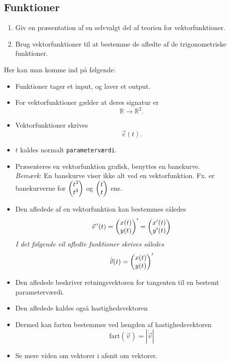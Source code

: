 \documentclass{article}
\begin{document}
\begin{tcolorbox}
	\section{Funktioner}
	\tcblower
	\begin{enumerate}
		\item Giv en præsentation af en selvvalgt del af teorien for vektorfunktioner.
		\item Brug vektorfunktioner til at bestemme de afledte af de trigonometriske funktioner.
	\end{enumerate}
\end{tcolorbox}
Her kan man komme ind på følgende:
\begin{itemize}
	\item Funktioner tager et input, og laver et output.
	\item For vektorfunktioner gælder at deres signatur er
		\[
			\mathbb{R} \rightarrow \mathbb{R}^2.
		\] 
	\item Vektorfunktioner skrives
		\[
			\vec{v}(t).
		\] 
	\item $t$ kaldes normalt \texttt{parameterværdi}.
	\item Præsenteres en vektorfunktion grafisk, benyttes en banekurve.\\
		\textit{Bemærk}: En banekurve viser ikke alt ved en vektorfunktion. Fx.
		er banekurverne for $ \begin{pmatrix} t^3\\ t^3 \end{pmatrix} $ og $ \begin{pmatrix} t\\ t \end{pmatrix} $ ens.
	\item Den afledede af en vektorfunktion kan bestemmes således
		\[
			\vec{v}\,'(t) =  \begin{pmatrix} x(t)\\ y(t) \end{pmatrix} ' =  \begin{pmatrix} x'(t)\\ y'(t) \end{pmatrix} 
		\] 
		\textit{I det følgende vil afledte funktioner skrives således}
		\[
			\dot{\vec{v}}(t) = { \begin{pmatrix} x(t)\\ y(t) \end{pmatrix} }'
		\] 
	\item Den afledede beskriver retningsvektoren for tangenten til en bestemt
		parameterværdi.

	\item Den afledede kaldes også hastighedsvektoren
	\item Dermed kan farten bestemmes ved længden af hastighedsvektoren
		\[
			\text{fart}(\vec{v}) = \left|\dot{\vec{v}}\right|
		\] 
	\item Se mere viden om vektorer i afsnit om vektorer.
\end{itemize}
\end{document}
